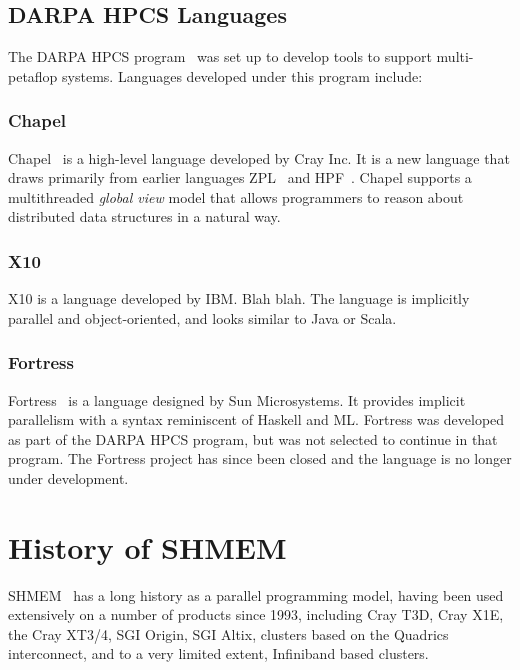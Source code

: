 
\subsection{DARPA HPCS Languages}

The DARPA HPCS program~\cite{DARPA:HPCS} was set up to develop tools to
support multi-petaflop systems.  Languages developed under this
program include:

\subsubsection{Chapel}

Chapel~\cite{chapel} is a high-level language developed by Cray Inc.
It is a new language that draws primarily from earlier languages
ZPL~\cite{zpl} and HPF~\cite{hpf}.  Chapel supports a multithreaded
\emph{global view} model that allows programmers to reason about
distributed data structures in a natural way.

\subsubsection{X10}

X10 is a language developed by IBM.  Blah blah.  The language is
implicitly parallel and object-oriented, and looks similar to Java or
Scala.

\subsubsection{Fortress}

Fortress~\cite{Fortress} is a language designed by Sun Microsystems.
It provides implicit parallelism with a syntax reminiscent of Haskell
and ML.  Fortress was developed as part of the DARPA HPCS program, but
was not selected to continue in that program.  The Fortress project
has since been closed and the language is no longer under development.


\section{History of SHMEM}

SHMEM~\cite{sgi_tut_000} has a long history as a parallel programming
model, having been used extensively on a number of products since
1993, including Cray T3D, Cray X1E, the Cray XT3/4, SGI Origin, SGI
Altix, clusters based on the Quadrics interconnect, and to a very
limited extent, Infiniband based clusters.

